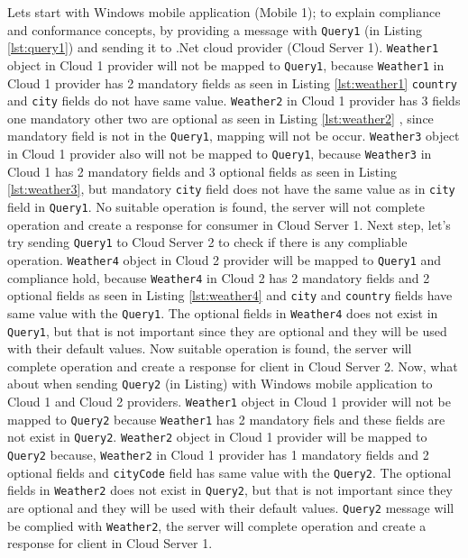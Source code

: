 Lets start with Windows mobile application (Mobile 1); to explain compliance and conformance concepts, by providing a message with {\tt Query1} (in Listing \ref{lst:query1}) and sending it to .Net cloud provider (Cloud Server 1).
{\tt Weather1} object in Cloud 1 provider will not be mapped to {\tt Query1}, because {\tt Weather1} in Cloud 1 provider has 2 mandatory fields as seen in Listing \ref{lst:weather1} {\tt country} and {\tt city} fields do not have same value. {\tt Weather2} in Cloud 1 provider has 3 fields one mandatory other two are optional as seen in Listing \ref{lst:weather2} , since mandatory field is not in the {\tt Query1}, mapping will not be occur. {\tt Weather3} object in Cloud 1 provider also will not be mapped to {\tt Query1}, because {\tt Weather3} in Cloud 1 has 2 mandatory fields and 3 optional fields as seen in Listing \ref{lst:weather3}, but mandatory {\tt city} field does not have the same value as in {\tt city} field in {\tt Query1}. No suitable operation is found, the server will not complete operation and create a response for consumer in Cloud Server 1. Next step, let's try sending {\tt Query1} to Cloud Server 2 to check if there is any compliable operation. {\tt Weather4} object in Cloud 2 provider will be mapped to {\tt Query1} and compliance hold, because {\tt Weather4} in Cloud 2 has 2 mandatory fields and 2 optional fields as seen in Listing \ref{lst:weather4} and {\tt city} and {\tt country} fields have same value with the {\tt Query1}. The optional fields in {\tt Weather4} does not exist in {\tt Query1}, but that is not important since they are optional and they will be used with their default values.  Now suitable operation is found, the server will complete operation and create a response for client in Cloud Server 2. Now, what about when sending {\tt Query2} (in Listing) with Windows mobile application to Cloud 1 and Cloud 2 providers. {\tt Weather1} object in Cloud 1 provider will not be mapped to {\tt Query2} because {\tt Weather1} has 2 mandatory fiels and these fields are not exist in {\tt Query2}. {\tt Weather2} object in Cloud 1 provider will be mapped to {\tt Query2} because, {\tt Weather2} in Cloud 1 provider has 1 mandatory fields and 2 optional fields and {\tt cityCode} field has same value with the {\tt Query2}. The optional fields in {\tt Weather2} does not exist in {\tt Query2}, but that is not important since they are optional and they will be used with their default values. {\tt Query2} message will be complied with {\tt Weather2}, the server will complete operation and create a response for client in Cloud Server 1.


